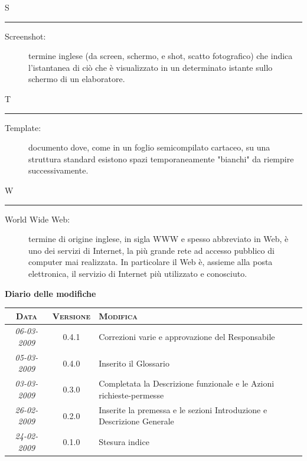 \documentclass[11pt,a4paper]{article}
\newcommand{\modifiche} 
{
\newpage
\begin{center}
\textbf{Diario delle modifiche} \\
\bigskip
\begin{tabular}{|c|c|p{0.62\textwidth}|}
\hline
\textsc{Data} & \textsc{Versione} & \textsc{Modifica} \\
\hline
\hline
\textit{06-03-2009} & 0.4.1 & Correzioni varie e approvazione del Responsabile\\
\hline
\textit{05-03-2009} & 0.4.0 & Inserito il Glossario\\
\hline
\textit{03-03-2009} & 0.3.0 & Completata la Descrizione funzionale e le Azioni richieste-permesse\\
\hline
\textit{26-02-2009} & 0.2.0 & Inserite la premessa e le sezioni Introduzione e Descrizione Generale\\
\hline
\textit{24-02-2009} & 0.1.0 & Stesura indice\\
\hline
\end{tabular}
\end{center}
}
\begin{document}
\bigskip
\Huge S \bigskip
\hrule
\smallskip
\normalsize
\begin{description}
	\item[Screenshot:] termine inglese (da screen, schermo, e shot, scatto fotografico) che indica l'istantanea di ciò che è visualizzato in un determinato istante sullo schermo di un elaboratore.
\end{description}
\bigskip
\Huge T \bigskip
\hrule
\smallskip
\normalsize
\begin{description}
	\item[Template:] documento dove, come in un foglio semicompilato cartaceo, su una struttura standard esistono spazi temporaneamente "bianchi" da riempire successivamente.
\end{description}
\bigskip
\Huge W \bigskip
\hrule
\smallskip
\normalsize
\begin{description}
	\item[World Wide Web:] termine di origine inglese, in sigla WWW e spesso abbreviato in Web, è uno dei servizi di Internet, la più grande rete ad accesso pubblico di computer mai realizzata. In particolare il Web è, assieme alla posta elettronica, il servizio di Internet più utilizzato e conosciuto.
\end{description}
\modifiche
\end{document}

